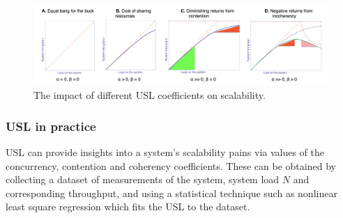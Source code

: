 \begin{figure}
    \centering
    \includegraphics[width=1.1\textwidth]{chapter-evaluation/usl-impact}
    \caption{The impact of different USL coefficients on scalability.~\cite{perfdynamics}}
    \label{fig:usl-impact}
\end{figure}

\subsubsection{USL in practice}
USL can provide insights into a system's scalability pains via  values of the concurrency, contention and coherency coefficients. These can be obtained by collecting a dataset of measurements of the system, system load $N$ and corresponding throughput, and using a statistical technique such as nonlinear least square regression which fits the USL to the dataset.~\cite{schwarz2015practical,heyman2014scalability}

